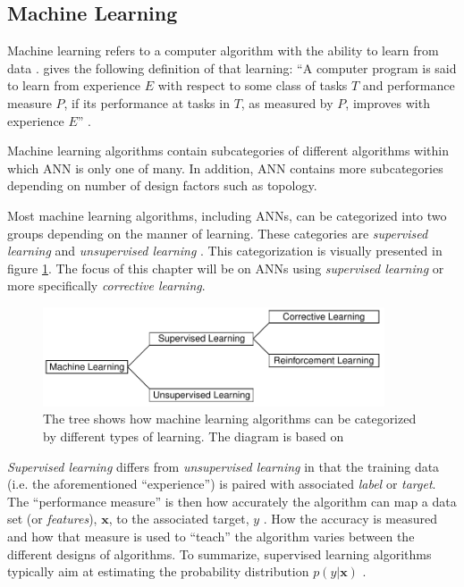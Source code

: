 \documentclass[../main.tex]{subfiles}
\begin{document}
\subsection{Machine Learning}
Machine learning refers to a computer algorithm with the ability to learn from data \cite{Goodfellow2016}. 
\textcite{Mitchell1997} gives the following definition of that learning: ``A computer program is said to learn from experience $E$ with respect to some class of tasks $T$ and performance measure $P$, if its performance at tasks in $T$, as measured by $P$, improves with experience $E$'' \parencite[2]{Mitchell1997}.

Machine learning algorithms contain subcategories of different algorithms within which \ac{ANN} is only one of many.
In addition, \ac{ANN} contains more subcategories depending on number of design factors such as topology.

Most machine learning algorithms, including \acp{ANN}, can be categorized into two groups depending on the manner of learning.
These categories are \textit{supervised learning} and \textit{unsupervised learning} \cite{Goodfellow2016}.
This categorization is visually presented in figure \ref{fig:types-of-learning}.
The focus of this chapter will be on \acp{ANN} using \textit{supervised learning} or more specifically \textit{corrective learning}.

\begin{figure}[ht]
    \centering
    \includegraphics[width=0.9\textwidth]{img/types-of-learning-diagram.pdf}
    \caption{The tree shows how machine learning algorithms can be categorized by different types of learning. The diagram is based on \cite[Fig. 4.3]{Rojas1996a}}
    \label{fig:types-of-learning}
\end{figure}

\textit{Supervised learning} differs from \textit{unsupervised learning} in that the training data (i.e. the aforementioned ``experience'') is paired with associated \textit{label} or \textit{target}.
The ``performance measure'' is then how accurately the algorithm can map a data set (or \textit{features}), $\mathbf{x}$, to the associated target, $y$ \cite{Goodfellow2016}.
How the accuracy is measured and how that measure is used to ``teach'' the algorithm varies between the different designs of algorithms.
To summarize, supervised learning algorithms typically aim at estimating the probability distribution $p(y | \mathbf{x})$ \cite{Goodfellow2016}.
\end{document}
